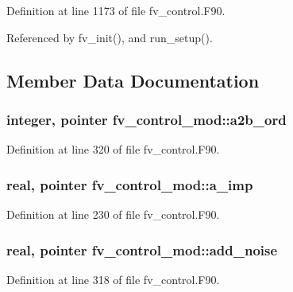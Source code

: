 Definition at line 1173 of file fv\-\_\-control.\-F90.



Referenced by fv\-\_\-init(), and run\-\_\-setup().



\subsection{Member Data Documentation}
\subsubsection[{a2b\-\_\-ord}]{\setlength{\rightskip}{0pt plus 5cm}integer, pointer fv\-\_\-control\-\_\-mod\-::a2b\-\_\-ord\hspace{0.3cm}{\ttfamily [private]}}\label{classfv__control__mod_acaa650e90ef998f47a632f0ee11740bd}


Definition at line 320 of file fv\-\_\-control.\-F90.

\subsubsection[{a\-\_\-imp}]{\setlength{\rightskip}{0pt plus 5cm}real, pointer fv\-\_\-control\-\_\-mod\-::a\-\_\-imp\hspace{0.3cm}{\ttfamily [private]}}\label{classfv__control__mod_aceee4c7f56525845684efc1a4fa67422}


Definition at line 230 of file fv\-\_\-control.\-F90.

\subsubsection[{add\-\_\-noise}]{\setlength{\rightskip}{0pt plus 5cm}real, pointer fv\-\_\-control\-\_\-mod\-::add\-\_\-noise\hspace{0.3cm}{\ttfamily [private]}}\label{classfv__control__mod_a163f8e15e0a8c866b7983d6886314c07}


Definition at line 318 of file fv\-\_\-control.\-F90.

